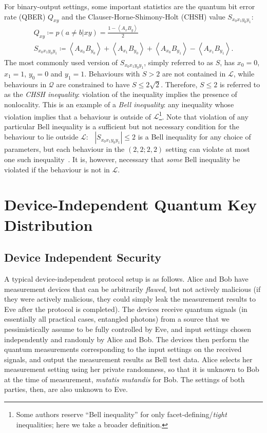 \documentclass[10pt, a4paper]{article}
\numberwithin{equation}{section} %
\theoremstyle{definition}
\theoremstyle{plain}
\newcommand{\abs}[1]{\mathop{}\left\lvert#1\right\rvert}
\newcommand{\?}{\mathrel{?}} %
\newcommand{\angleb}[1]{\left\langle #1 \right\rangle} %
\newcommand{\Ls}{\mathcal{L}}
\newcommand{\Qs}{\mathcal{Q}}
\begin{document}
    For binary-output settings, some important statistics are the quantum bit error rate (QBER) \(Q_{xy}\) and the Clauser-Horne-Shimony-Holt (CHSH) value \(S_{x_0x_1y_0y_1}\):
    \begin{gather}
      Q_{xy} \coloneqq p(a \neq b|xy) = \frac{1-\angleb{A_x B_y}}{2} \\
      S_{x_0x_1y_0y_1} \coloneqq \angleb{A_{x_0} B_{y_0}} + \angleb{A_{x_1} B_{y_0}} + \angleb{A_{x_0} B_{y_1}} - \angleb{A_{x_1} B_{y_1}}.
    \end{gather}
    The most commonly used version of \(S_{x_0x_1y_0y_1}\), simply referred to as \(S\), has \(x_0=0\), \(x_1=1\), \(y_0=0\) and \(y_1=1\). Behaviours with \(S > 2\) are not contained in \(\Ls\), while behaviours in \(\Qs\) are constrained to have \(S \leq 2\sqrt{2}\). Therefore, \(S \leq 2\) is referred to as the \emph{CHSH inequality}: violation of the inequality implies the presence of nonlocality. This is an example of a \emph{Bell inequality}: any inequality whose violation implies that a behaviour is outside of \(\Ls\)\footnote{Some authors reserve ``Bell inequality'' for only facet-defining/\emph{tight} inequalities; here we take a broader definition.}. Note that violation of any particular Bell inequality is a sufficient but not necessary condition for the behaviour to lie outside \(\Ls\): \(\abs{S_{x_0x_1y_0y_1}} \leq 2\) is a Bell inequality for any choice of parameters, but each behaviour in the \((2,2;2,2)\) setting can violate at most one such inequality~\cite{GeomDecomp}. It is, however, necessary that \emph{some} Bell inequality be violated if the behaviour is not in \(\Ls\).

    \section{Device-Independent Quantum Key Distribution}\label{sec:diqkd}

    \subsection{Device Independent Security}\label{sec:diqkd_di}

    A typical device-independent protocol setup is as follows. Alice and Bob have measurement devices that can be arbitrarily \emph{flawed}, but not actively malicious (if they were actively malicious, they could simply leak the measurement results to Eve after the protocol is completed). The devices receive quantum signals (in essentially all practical cases, entangled photons) from a source that we pessimistically assume to be fully controlled by Eve, and input settings chosen independently and randomly by Alice and Bob. The devices then perform the quantum measurements corresponding to the input settings on the received signals, and output the measurement results as Bell test data. Alice selects her measurement setting using her private randomness, so that it is unknown to Bob at the time of measurement, \emph{mutatis mutandis} for Bob. The settings of both parties, then, are also unknown to Eve.
\end{document}
